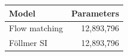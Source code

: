 \begin{tabular}{lr}
\toprule
Model & Parameters \\
\midrule
Flow matching & 12,893,796 \\
Föllmer SI & 12,893,796 \\
\bottomrule
\end{tabular}
